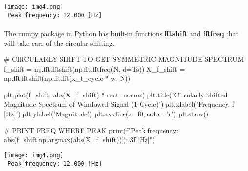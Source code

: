 \documentclass{report}
\begin{document}
\texttt{[image: img4.png]} \\ 
\texttt{ Peak frequency: 12.000 [Hz]}
\\ \\
The numpy package in Python has built-in functions \textbf{fftshift} and \textbf{fftfreq} that will take care of the circular shifting.
\begin{python}
# CIRCULARLY SHIFT TO GET SYMMETRIC MAGNITUDE SPECTRUM
f_shift = np.fft.fftshift(np.fft.fftfreq(N, d=Ts))
X_f_shift = np.fft.fftshift(np.fft.fft(x_t_cycle * w, N))

plt.plot(f_shift, abs(X_f_shift) * rect_normz)
plt.title('Circularly Shifted Magnitude Spectrum of \n Windowed Signal (1-Cycle)')
plt.xlabel('Frequency, f [Hz]')
plt.ylabel('Magnitude')
plt.axvline(x=f0, color='r')
plt.show()

# PRINT FREQ WHERE PEAK
print(f"Peak frequency: {abs(f_shift[np.argmax(abs(X_f_shift))]):.3f} [Hz]")
\end{python}
\texttt{[image: img4.png]} \\ 
\texttt{ Peak frequency: 12.000 [Hz]}

\pagebreak
\end{document}
